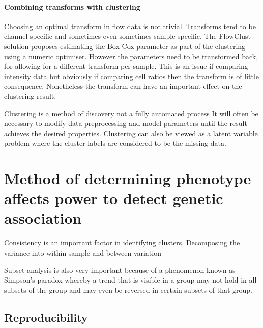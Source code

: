 \paragraph{Combining transforms with clustering}

Choosing an optimal transform in flow data is not trivial.
Transforms tend to be channel specific and sometimes even sometimes sample specific.
The FlowClust solution proposes estimating the Box-Cox parameter as part of the clustering using a numeric optimiser.
However the parameters need to be transformed back, for allowing for a different transform per sample.
This is an issue if comparing intensity data but obviously if comparing cell ratios then the transform is of little consequence.
Nonetheless the transform can have an important effect on the clustering result.

Clustering is a method of discovery not a fully automated process
It will often be necessary to modify data preprocessing and model parameters until the result achieves the desired properties.  
Clustering can also be viewed as a latent variable problem where the cluster labels are considered to be the missing data.




\section{ Method of determining phenotype affects power to detect genetic association }


Consistency is an important factor in identifying clusters.
Decomposing the variance into within sample and between variation

Subset analysis is also very important because of a phenomenon known as Simpson’s paradox whereby a trend that is visible in a group may not hold in all subsets of the group and may even be reversed in certain subsets of that group.

\subsection{Reproducibility}


